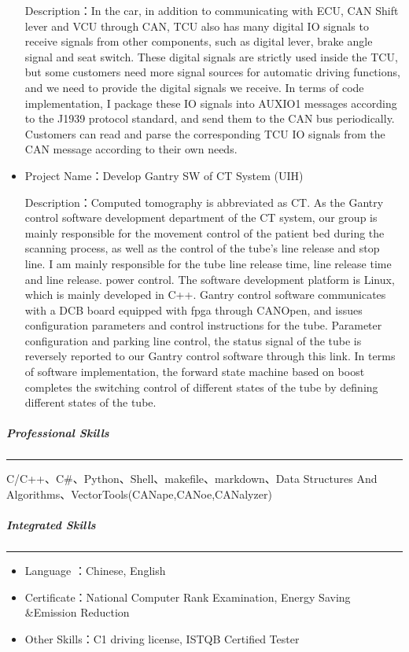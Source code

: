 \documentclass[
]{article}
\begin{document}
\begin{CJK}{UTF8}{gbsn}
\begin{itemize}
  Description：In the car, in addition to communicating with ECU, CAN
  Shift lever and VCU through CAN, TCU also has many digital IO signals
  to receive signals from other components, such as digital lever, brake
  angle signal and seat switch. These digital signals are strictly used
  inside the TCU, but some customers need more signal sources for
  automatic driving functions, and we need to provide the digital
  signals we receive. In terms of code implementation, I package these
  IO signals into AUXIO1 messages according to the J1939 protocol
  standard, and send them to the CAN bus periodically. Customers can
  read and parse the corresponding TCU IO signals from the CAN message
  according to their own needs.
\item
  Project Name：Develop Gantry SW of CT System (UIH)

  Description：Computed tomography is abbreviated as CT. As the Gantry
  control software development department of the CT system, our group is
  mainly responsible for the movement control of the patient bed during
  the scanning process, as well as the control of the tube's line
  release and stop line. I am mainly responsible for the tube line
  release time, line release time and line release. power control. The
  software development platform is Linux, which is mainly developed in
  C++. Gantry control software communicates with a DCB board equipped
  with fpga through CANOpen, and issues configuration parameters and
  control instructions for the tube. Parameter configuration and parking
  line control, the status signal of the tube is reversely reported to
  our Gantry control software through this link. In terms of software
  implementation, the forward state machine based on boost completes the
  switching control of different states of the tube by defining
  different states of the tube.
\end{itemize}

\hypertarget{professional-skills}{%
\subparagraph{Professional Skills}\label{professional-skills}}

\begin{center}\rule{0.5\linewidth}{0.5pt}\end{center}

C/C++、C\#、Python、Shell、makefile、markdown、Data Structures And
Algorithms、VectorTools(CANape,CANoe,CANalyzer)

\hypertarget{integrated-skills}{%
\subparagraph{Integrated Skills}\label{integrated-skills}}

\begin{center}\rule{0.5\linewidth}{0.5pt}\end{center}

\begin{itemize}
\item
  Language ：Chinese, English
\item
  Certificate：National Computer Rank Examination, Energy Saving
  \&Emission Reduction
\item
  Other Skills：C1 driving license, ISTQB Certified Tester
\end{itemize}
\end{CJK}
\end{document}
